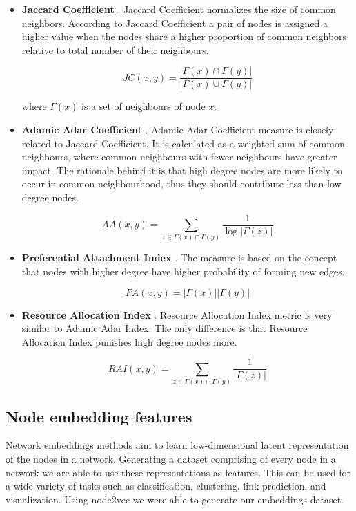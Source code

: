 \documentclass[9pt,twocolumn,twoside]{pnas-new}
\begin{document}
\begin{itemize}
    \item \textbf{Jaccard Coefficient} \cite{Salton1986}.
    Jaccard Coefficient normalizes the size of common neighbors. According to Jaccard Coefficient a pair of nodes is assigned a higher value when the nodes share a higher proportion of common neighbors relative to total number of their neighbours.

    $$JC(x, y) = \frac{ |\Gamma(x) \cap \Gamma (y)| }{|\Gamma(x) \cup \Gamma (y)|}$$
    
    where $\Gamma(x)$ is a set of neighbours of node $x$.
    
    
    \item \textbf{Adamic Adar Coefficient} \cite{Adamic2003}.
    Adamic Adar Coefficient measure is closely related to Jaccard Coefficient. It is calculated as a weighted sum of common neighbours, where common neighbours with fewer neighbours have greater impact. The rationale behind it is that high degree nodes are more likely to occur in common neighbourhood, thus they should contribute less than low degree nodes. 
    
    $$ AA(x, y) = \sum_{z \in \Gamma(x) \cap \Gamma (y)} \frac{1}{\log |\Gamma(z)|} $$
    
    
    \item \textbf{Preferential Attachment Index} \cite{Barabasi2002}. The measure is based on the concept that nodes with higher degree have higher probability of forming new edges. 
    
    $$ PA(x, y) = |\Gamma(x)||\Gamma(y)| $$
    
    
    \item \textbf{Resource Allocation Index} \cite{Zhou2009}.
    Resource Allocation Index metric is very similar to Adamic Adar Index. The only difference is that Resource Allocation Index punishes high degree nodes more.
    
    $$ RAI(x, y) = \sum_{z \in \Gamma(x) \cap \Gamma (y)} \frac{1}{|\Gamma(z)|} $$
    
    
\end{itemize}





\subsection*{Node embedding features}

Network embeddings methods aim to learn low-dimensional latent representation of the nodes in a network. Generating a dataset comprising of every node in a network we are able to use these representations as features. This can be used for a wide variety of tasks such as classification, clustering, link prediction, and visualization. Using node2vec \cite{Grover2016} we were able to generate our embeddings dataset.
\end{document}
